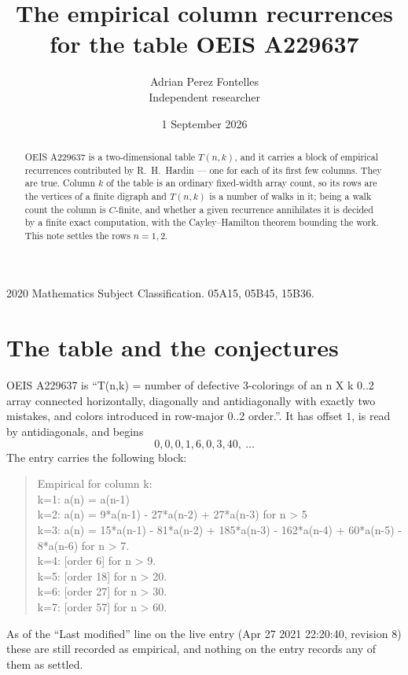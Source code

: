 \documentclass[11pt,a4paper]{article}
\title{The empirical column recurrences for the table OEIS A229637}
\author{Adrian Perez Fontelles\\ \small Independent researcher}
\date{1 September 2026}
\theoremstyle{plain}
\theoremstyle{definition}
\begin{document}
\maketitle

\begin{abstract}
OEIS A229637 is a two-dimensional table $T(n,k)$, and it carries a block of empirical
recurrences contributed by R.~H.~Hardin --- one for each of its first few columns. They are
true. Column $k$ of the table is an ordinary fixed-width array count, so its rows are the
vertices of a finite digraph and $T(n,k)$ is a number of walks in it; being a walk count the
column is $C$-finite, and whether a given recurrence annihilates it is decided by a finite
exact computation, with the Cayley--Hamilton theorem bounding the work. This note settles the rows $n=1, 2$.
\end{abstract}

\noindent\small 2020 Mathematics Subject Classification. 05A15, 05B45, 15B36.\normalsize

\section{The table and the conjectures}

OEIS A229637 is ``T(n,k) = number of defective 3-colorings of an n X k 0..2 array connected horizontally, diagonally and antidiagonally with exactly two mistakes, and colors introduced in row-major 0..2 order.''. It has offset $1$, is
read by antidiagonals, and begins
\[
0, 0, 0, 1, 6, 0, 3, 40,\ \dots
\]
The entry carries the following block:
\begin{quote}\small
Empirical for column k:\\
k=1: a(n) = a(n-1)\\
k=2: a(n) = 9*a(n-1) - 27*a(n-2) + 27*a(n-3) for n > 5\\
k=3: a(n) = 15*a(n-1) - 81*a(n-2) + 185*a(n-3) - 162*a(n-4) + 60*a(n-5) - 8*a(n-6) for n > 7.\\
k=4: [order 6] for n > 9.\\
k=5: [order 18] for n > 20.\\
k=6: [order 27] for n > 30.\\
k=7: [order 57] for n > 60.\\
\end{quote}
As of the ``Last modified'' line on the live entry (Apr 27 2021 22:20:40, revision 8) these are still
recorded as empirical, and nothing on the entry records any of them as settled.
\end{document}
